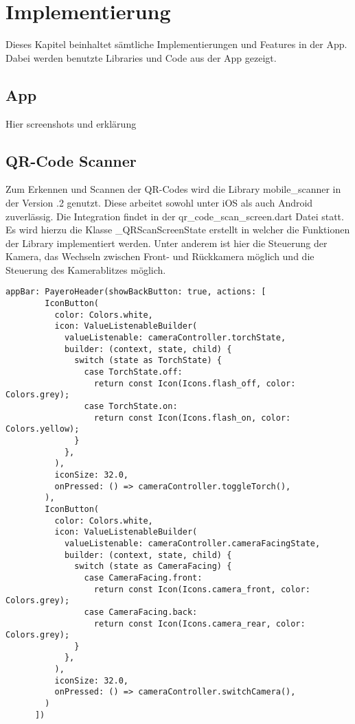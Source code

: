 
\chapter{Implementierung}

Dieses Kapitel beinhaltet sämtliche Implementierungen und Features in der App.
Dabei werden benutzte Libraries und Code aus der App gezeigt.

\section{App}

Hier screenshots und erklärung

\section{QR-Code Scanner}

Zum Erkennen und Scannen der QR-Codes wird die Library \glqq mobile\_scanner\grqq{} in der Version .2\grqq{} genutzt.
Diese arbeitet sowohl unter iOS als auch Android zuverlässig.
Die Integration findet in der \glqq qr\_code\_scan\_screen.dart\grqq{} Datei statt.
Es wird hierzu die Klasse \glqq \_QRScanScreenState\grqq{} erstellt in welcher die Funktionen der Library implementiert werden.
Unter anderem ist hier die Steuerung der Kamera, das Wechseln zwischen Front- und Rückkamera möglich und die Steuerung des Kamerablitzes möglich.

\begin{lstlisting}[caption=Kamerasteuerung, label=cam_ctrl]
	appBar: PayeroHeader(showBackButton: true, actions: [
        IconButton(
          color: Colors.white,
          icon: ValueListenableBuilder(
            valueListenable: cameraController.torchState,
            builder: (context, state, child) {
              switch (state as TorchState) {
                case TorchState.off:
                  return const Icon(Icons.flash_off, color: Colors.grey);
                case TorchState.on:
                  return const Icon(Icons.flash_on, color: Colors.yellow);
              }
            },
          ),
          iconSize: 32.0,
          onPressed: () => cameraController.toggleTorch(),
        ),
        IconButton(
          color: Colors.white,
          icon: ValueListenableBuilder(
            valueListenable: cameraController.cameraFacingState,
            builder: (context, state, child) {
              switch (state as CameraFacing) {
                case CameraFacing.front:
                  return const Icon(Icons.camera_front, color: Colors.grey);
                case CameraFacing.back:
                  return const Icon(Icons.camera_rear, color: Colors.grey);
              }
            },
          ),
          iconSize: 32.0,
          onPressed: () => cameraController.switchCamera(),
        )
      ])
\end{lstlisting}

